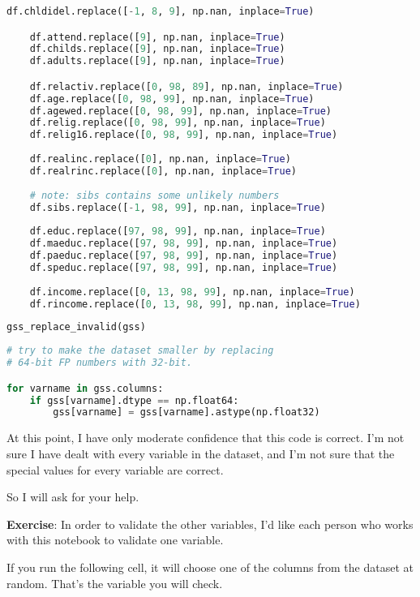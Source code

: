 \begin{lstlisting}[language=Python]
    df.chldidel.replace([-1, 8, 9], np.nan, inplace=True)

    df.attend.replace([9], np.nan, inplace=True)
    df.childs.replace([9], np.nan, inplace=True)
    df.adults.replace([9], np.nan, inplace=True)

    df.relactiv.replace([0, 98, 89], np.nan, inplace=True)
    df.age.replace([0, 98, 99], np.nan, inplace=True)
    df.agewed.replace([0, 98, 99], np.nan, inplace=True)
    df.relig.replace([0, 98, 99], np.nan, inplace=True)
    df.relig16.replace([0, 98, 99], np.nan, inplace=True)
    
    df.realinc.replace([0], np.nan, inplace=True)                  
    df.realrinc.replace([0], np.nan, inplace=True)                  
    
    # note: sibs contains some unlikely numbers
    df.sibs.replace([-1, 98, 99], np.nan, inplace=True)
    
    df.educ.replace([97, 98, 99], np.nan, inplace=True)
    df.maeduc.replace([97, 98, 99], np.nan, inplace=True)
    df.paeduc.replace([97, 98, 99], np.nan, inplace=True)
    df.speduc.replace([97, 98, 99], np.nan, inplace=True)
    
    df.income.replace([0, 13, 98, 99], np.nan, inplace=True)
    df.rincome.replace([0, 13, 98, 99], np.nan, inplace=True)    
\end{lstlisting}

\begin{lstlisting}[language=Python]
gss_replace_invalid(gss)
\end{lstlisting}

\begin{lstlisting}[language=Python]
# try to make the dataset smaller by replacing
# 64-bit FP numbers with 32-bit.

for varname in gss.columns:
    if gss[varname].dtype == np.float64:
        gss[varname] = gss[varname].astype(np.float32)
\end{lstlisting}

At this point, I have only moderate confidence that this code is
correct. I'm not sure I have dealt with every variable in the dataset,
and I'm not sure that the special values for every variable are correct.

So I will ask for your help.

\textbf{Exercise}: In order to validate the other variables, I'd like
each person who works with this notebook to validate one variable.

If you run the following cell, it will choose one of the columns from
the dataset at random. That's the variable you will check.

